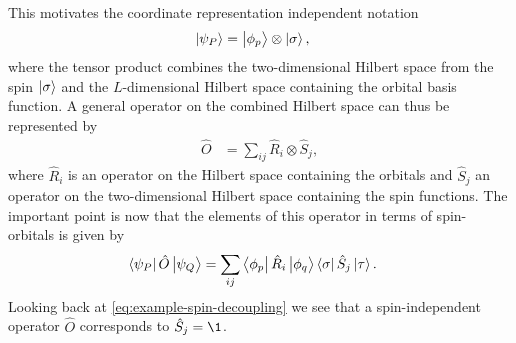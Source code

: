         This motivates the coordinate representation independent notation
        \begin{align}
            \ket{\psi_P}
            &= \ket{\phi_p}\otimes\ket{\sigma},
        \end{align}
        where the tensor product combines the two-dimensional Hilbert space from
        the spin $\ket{\sigma}$ and the $L$-dimensional Hilbert space
        containing the orbital basis function.
        A general operator on the combined Hilbert space can thus be represented
        by
        \begin{align}
            \hat{O}
            &= \sum_{ij} \hat{R}_i \otimes \hat{S}_j,
        \end{align}
        where $\hat{R}_i$ is an operator on the Hilbert space containing the
        orbitals and $\hat{S}_j$ an operator on the two-dimensional Hilbert
        space containing the spin functions.
        The important point is now that the elements of this operator in terms
        of spin-orbitals is given by
        \begin{align}
            \bra{\psi_{P}}\hat{O}\ket{\psi_{Q}}
            &=
            \sum_{ij}\bra{\phi_p}\hat{R}_i\ket{\phi_q}
            \bra{\sigma}\hat{S}_j\ket{\tau}.
        \end{align}
        Looking back at \autoref{eq:example-spin-decoupling} we see that a
        spin-independent operator $\hat{O}$ corresponds to $\hat{S}_j = \1$.

